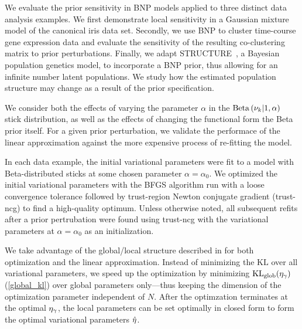 We evaluate the prior sensitivity in BNP models applied to three distinct data analysis examples.
We first demonstrate local sensitivity in a Gaussian mixture model of the canonical iris data set.
Secondly, we use BNP to cluster time-course gene expression data
and evaluate the sensitivity of the resulting co-clustering matrix to prior perturbations.
Finally, we adapt STRUCTURE~\citep{pritchard:2000:structure}, a Bayesian population genetics model,
to incorporate a BNP prior, thus allowing for
an infinite number latent populations.
We study how the estimated population structure may change as a
result of the prior specification.

We consider both the effects of varying the parameter $\alpha$
in the $\mathrm{Beta}\left(\nu_{k} \vert 1, \alpha\right)$ stick distribution, as well as
the effects of changing the functional form the Beta prior itself.
For a given prior perturbation,
we validate the performace of the linear approximation against
the more expensive process of re-fitting the model.

In each data example,
the initial variational parameters were fit to a model
with Beta-distributed sticks at some chosen parameter $\alpha = \alpha_0$.
We optimized the initial variational parameters with
the BFGS algorithm run with a loose convergence tolerance
followed by trust-region Newton conjugate gradient (trust-ncg) to find a high-quality optimum.
Unless otherwise noted, all subsequent refits after a prior pertrubation were found
using trust-ncg with the variational parameters at $\alpha = \alpha_0$ as an initialization.

We take advantage of the global/local structure described in 
for both optimization and the
linear approximation.
Instead of minimizing the $\mathrm{KL}$ over all variational parameters,
we speed up the optimization by minimizing $\mathrm{KL}_{\mathrm{glob}}(\eta_{\gamma})$ (\eqref{global_kl})
over global parameters only---thus keeping the dimension of the optimization parameter independent of $N$.
After the optimzation terminates at the optimal $\eta_{\gamma}$,
the local parameters can be set optimally in closed form
to form the optimal variational parameters $\hat\eta$.

